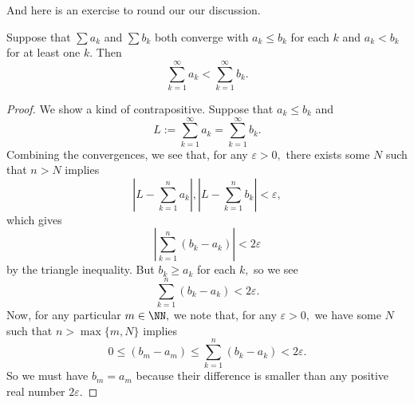 And here is an exercise to round our our discussion.
\begin{exercise}[Ross 16.13]
	Suppose that $\sum a_k$ and $\sum b_k$ both converge with $a_k\le b_k$ for each $k$ and $a_k<b_k$ for at least one $k.$ Then
	\[\sum_{k=1}^\infty a_k<\sum_{k=1}^\infty b_k.\]
\end{exercise}
\begin{proof}
	We show a kind of contrapositive. Suppose that $a_k\le b_k$ and
	\[L:=\sum_{k=1}^\infty a_k=\sum_{k=1}^\infty b_k.\]
	Combining the convergences, we see that, for any $\varepsilon>0,$ there exists some $N$ such that $n>N$ implies
	\[\left|L-\sum_{k=1}^na_k\right|,\left|L-\sum_{k=1}^nb_k\right|<\varepsilon,\]
	which gives
	\[\left|\sum_{k=1}^n(b_k-a_k)\right|<2\varepsilon\]
	by the triangle inequality. But $b_k\ge a_k$ for each $k,$ so we see
	\[\sum_{k=1}^n(b_k-a_k)<2\varepsilon.\]
	Now, for any particular $m\in\NN,$ we note that, for any $\varepsilon>0,$ we have some $N$ such that $n>\max\{m,N\}$ implies
	\[0\le(b_m-a_m)\le\sum_{k=1}^n(b_k-a_k)<2\varepsilon.\]
	So we must have $b_m=a_m$ because their difference is smaller than any positive real number $2\varepsilon.$
\end{proof}